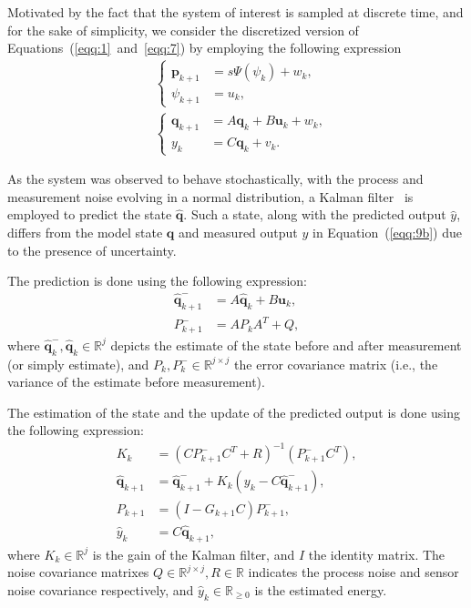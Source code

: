 \documentclass[letterpaper,10pt,conference]{ieeeconf}
\begin{document}
Motivated by the fact that the system of interest is sampled at discrete time, and for the sake of simplicity, we consider the discretized version of Equations~(\ref{eqq:1}~and~\ref{eqq:7}) by employing the following expression
\begin{subequations}\begin{align}
  &\begin{cases}
  \mathbf{p}_{k+1}&=s\Psi(\psi_k)+w_k,\\
  \psi_{k+1}&=u_k,
  \end{cases}\tag{9b}\label{eqq:9b}\\
  &\begin{cases}
  \mathbf{q}_{k+1}&=A\mathbf{q}_{k}+B\mathbf{u}_{k}+w_k,\\
  y_k&=C\mathbf{q}_k+v_k.
  \end{cases}
\end{align}\end{subequations}

As the system was observed to behave stochastically, with the process and measurement noise evolving in a normal distribution, a Kalman filter~\cite{stengel1994optimal, simon2006optimal} is employed to predict the state $\hat{\mathbf{q}}$. Such a state, along with the predicted output $\hat{y}$, differs from the model state $\mathbf{q}$ and measured output $y$ in Equation~(\ref{eqq:9b}) due to the presence of uncertainty.

The prediction is done using the following expression:
\begin{subequations}\label{eqq:10}\begin{align}
  \hat{\mathbf{q}}_{k+1}^-&=A\hat{\mathbf{q}}_{k}+B\mathbf{u}_k,\label{eqq:10a}\\
  P_{k+1}^-&=AP_kA^T+Q,\label{eqq:10b}
\end{align}\end{subequations}
where $\hat{\mathbf{q}}_k^-,\hat{\mathbf{q}}_k\in\mathbb{R}^j$ depicts the estimate of the state before and after measurement (or simply estimate), and $P_k,P_k^-\in\mathbb{R}^{j\times j}$ the error covariance matrix (i.e., the variance of the estimate before measurement). 

The estimation of the state and the update of the predicted output is done using the following expression:
\begin{subequations}\label{eqq:11}\begin{align}
  K_k&=(CP_{k+1}^-C^T+R)^{-1}(P_{k+1}^-C^T),\\
  \hat{\mathbf{q}}_{k+1}&=\hat{\mathbf{q}}_{k+1}^-+K_k(y_k-C\hat{\mathbf{q}}_{k+1}^-),\label{eqq:11b}\\
  P_{k+1}&=(I-G_{k+1}C)P_{k+1}^-,\\
  \hat{y}_k&=C\hat{\mathbf{q}}_{k+1},\label{eqq:11d}
\end{align}
\end{subequations}
where $K_k\in\mathbb{R}^j$ is the gain of the Kalman filter, and $I$ the identity matrix. The noise covariance matrixes $Q\in\mathbb{R}^{j\times j},R\in\mathbb{R}$ indicates the process noise and sensor noise covariance respectively, and $\hat{y}_k\in\mathbb{R}_{\geq 0}$ is the estimated energy.
\end{document}
